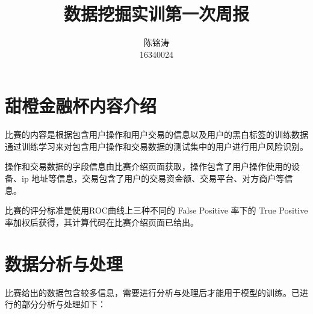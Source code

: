 \documentclass[12pt]{article}
\begin{document}
\author{陈铭涛\\16340024}
\title{数据挖掘实训第一次周报}
\maketitle

\medskip


\section{甜橙金融杯内容介绍}

\hspace{\parindent}比赛的内容是根据包含用户操作和用户交易的信息以及用户的黑白标签的训练数据通过训练学习来对包含用户操作和交易数据的测试集中的用户进行用户风险识别。

操作和交易数据的字段信息由比赛介绍页面获取，操作包含了用户操作使用的设备、ip 地址等信息，交易包含了用户的交易资金额、交易平台、对方商户等信息。

比赛的评分标准是使用ROC曲线上三种不同的 False Positive 率下的 True Positive 率加权后获得，其计算代码在比赛介绍页面已给出。

\section{数据分析与处理}
\hspace{\parindent}比赛给出的数据包含较多信息，需要进行分析与处理后才能用于模型的训练。已进行的部分分析与处理如下：
\end{document}
